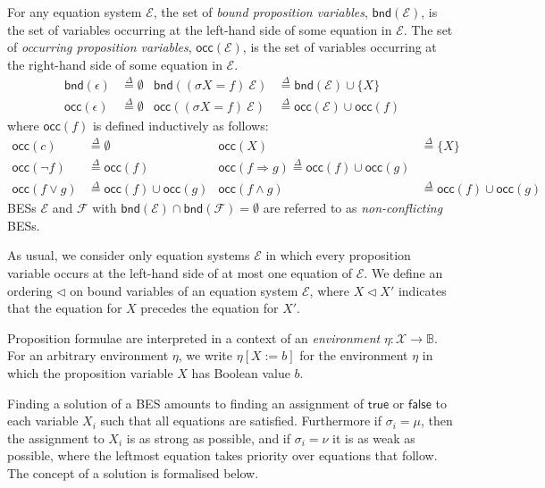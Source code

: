 \documentclass[a4paper,11pt]{article}
\newcommand{\tle}{\ensuremath{\triangleleft}}
\newcommand{\isdef}{\ensuremath{\stackrel{\Delta}{=}}}
\newcommand{\ap}{{:}}
\newcommand{\mc}[1]{\ensuremath{\mathcal{#1}}}
\newcommand{\bool}{\ensuremath{\mathbb{B}}}   %
\newcommand{\true}{\ensuremath{\mathsf{true}}}
\newcommand{\false}{\ensuremath{\mathsf{false}}}
\newcommand{\bnd}[1]{\ensuremath{\mathsf{bnd}(#1)}}
\newcommand{\occ}[1]{\ensuremath{\mathsf{occ}(#1)}}
\newcommand{\imp}{\ensuremath{\Rightarrow}}
\begin{document}
%
For any equation system $\mc{E}$, the set of \emph{bound proposition variables},
$\bnd{\mc{E}}$, is the set of variables occurring at the left-hand side of
some equation in $\mc{E}$. The set of \emph{occurring proposition variables},
$\occ{\mc{E}}$, is the set of variables occurring at the right-hand side of
some equation in $\mc{E}$. 
\begin{align*}
\bnd{\epsilon} & \isdef \emptyset &
\bnd{(\sigma X = f)~\mc{E}} & \isdef \bnd{\mc{E}} \cup \{X\}\\
  \occ{\epsilon} & \isdef \emptyset &
  \occ{(\sigma X = f)~\mc{E}} & \isdef \occ{\mc{E}} \cup \occ{f} 
\end{align*}
%
where $\occ{f}$ is defined inductively as follows:
\begin{align*}
  \occ{c} & \isdef \emptyset  & \occ{X}     & \isdef \{X\}   \\
  \occ{\neg f} & \isdef \occ{f} &
  \occ{f \imp g} \isdef \occ{f} \cup \occ{g} \\
  \occ{f \vee g} & \isdef \occ{f} \cup \occ{g} & 
  \occ{f \wedge g} & \isdef \occ{f} \cup \occ{g} 
\end{align*}
%
BESs $\mc{E}$ and $\mc{F}$ with $\bnd{\mc{E}} \cap \bnd{\mc{F}} = \emptyset$
are referred to as \emph{non-conflicting} BESs.

As usual, we consider only equation systems $\mc{E}$ in which
every proposition variable occurs at the left-hand side of at most one
equation of $\mc{E}$. We define an ordering $\tle$
on bound variables of an equation system $\mc{E}$, where $X \tle X'$
indicates that the equation for $X$ precedes the equation for $X'$.

Proposition formulae are interpreted in a context of an
\emph{environment} $\eta \ap \mc{X} \to \bool$. For an
arbitrary environment $\eta$, we write $\eta [X:=b]$ for the environment
$\eta$ in which the proposition variable $X$ has
Boolean value $b$.
%

Finding a solution of a BES amounts to finding an assignment of $\true$ or
$\false$ to each variable $X_i$ such that all equations are satisfied.
Furthermore if $\sigma_i = \mu$, then the assignment to $X_i$ is as strong as
possible, and if $\sigma_i = \nu$ it is as weak as possible, where the
leftmost equation takes priority over equations that follow. The concept
of a solution is formalised below.
\end{document}
